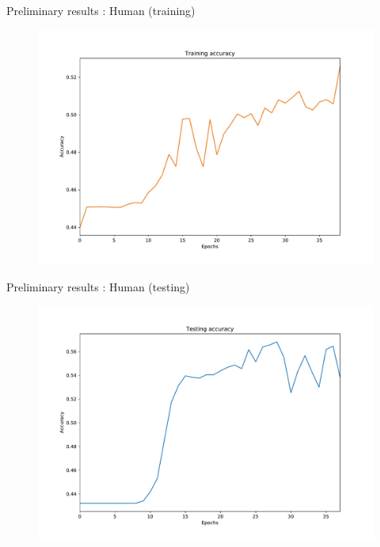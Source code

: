 \documentclass[11pt]{beamer}
\begin{document}
\begin{frame}{Preliminary results : Human (training)}
\begin{figure}
\includegraphics[width=\textwidth,height=\textheight,keepaspectratio]{training_accuracy_human}
\end{figure}
\end{frame}

\begin{frame}{Preliminary results : Human (testing)}
\begin{figure}
\includegraphics[width=\textwidth,height=\textheight,keepaspectratio]{testing_accuracy_human}
\end{figure}
\end{frame}
\end{document}
